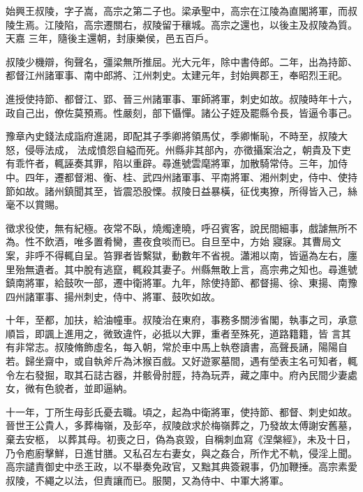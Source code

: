 
\begin{pinyinscope}

 始興王叔陵，字子嵩，高宗之第二子也。梁承聖中，高宗在江陵為直閣將軍，而叔陵生焉。江陵陷，高宗遷關右，叔陵留于穰城。高宗之還也，以後主及叔陵為質。天嘉
 三年，隨後主還朝，封康樂侯，邑五百戶。



 叔陵少機辯，徇聲名，彊梁無所推屈。光大元年，除中書侍郎。二年，出為持節、都督江州諸軍事、南中郎將、江州刺史。太建元年，封始興郡王，奉昭烈王祀。



 進授使持節、都督江、郢、晉三州諸軍事、軍師將軍，刺史如故。叔陵時年十六，政自己出，僚佐莫預焉。性嚴刻，部下懾憚。諸公子姪及罷縣令長，皆逼令事己。



 豫章內史錢法成詣府進謁，即配其子季卿將領馬仗，季卿慚恥，不時至，叔陵大怒，侵辱法成，
 法成憤怨自縊而死。州縣非其部內，亦徵攝案治之，朝貴及下吏有乖忤者，輒誣奏其罪，陷以重辟。尋進號雲麾將軍，加散騎常侍。三年，加侍中。四年，遷都督湘、衡、桂、武四州諸軍事、平南將軍、湘州刺史，侍中、使持節如故。諸州鎮聞其至，皆震恐股慄。叔陵日益暴橫，征伐夷獠，所得皆入己，絲毫不以賞賜。



 徵求役使，無有紀極。夜常不臥，燒燭達曉，呼召賓客，說民間細事，戲謔無所不為。性不飲酒，唯多置肴臠，晝夜食啖而已。自旦至中，方始
 寢寐。其曹局文案，非呼不得輒自呈。笞罪者皆繫獄，動數年不省視。瀟湘以南，皆逼為左右，廛里殆無遺者。其中脫有逃竄，輒殺其妻子。州縣無敢上言，高宗弗之知也。尋進號鎮南將軍，給鼓吹一部，遷中衛將軍。九年，除使持節、都督揚、徐、東揚、南豫四州諸軍事、揚州刺史，侍中、將軍、鼓吹如故。



 十年，至都，加扶，給油幢車。叔陵治在東府，事務多關涉省閣，執事之司，承意順旨，即諷上進用之，微致違忤，必抵以大罪，重者至殊死，道路籍籍，皆
 言其有非常志。叔陵脩飾虛名，每入朝，常於車中馬上執卷讀書，高聲長誦，陽陽自若。歸坐齋中，或自執斧斤為沐猴百戲。又好遊冢墓間，遇有塋表主名可知者，輒令左右發掘，取其石誌古器，并骸骨肘脛，持為玩弄，藏之庫中。府內民間少妻處女，微有色貌者，並即逼納。



 十一年，丁所生母彭氏憂去職。頃之，起為中衛將軍，使持節、都督、刺史如故。晉世王公貴人，多葬梅嶺，及彭卒，叔陵啟求於梅嶺葬之，乃發故太傅謝安舊墓，棄去安柩，
 以葬其母。初喪之日，偽為哀毀，自稱刺血寫《涅槃經》，未及十日，乃令庖廚擊鮮，日進甘膳。又私召左右妻女，與之姦合，所作尤不軌，侵淫上聞。高宗譴責御史中丞王政，以不舉奏免政官，又黜其典簽親事，仍加鞭捶。高宗素愛叔陵，不繩之以法，但責讓而已。服闋，又為侍中、中軍大將軍。




\end{pinyinscope}
